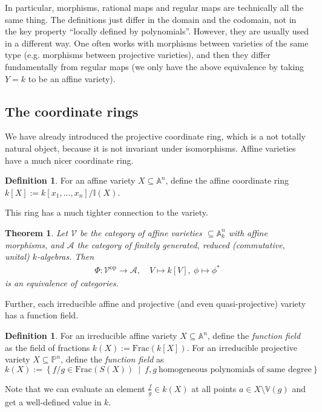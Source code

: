 \documentclass{scrartcl}
\newcommand{\I}{\mathbb{I}}
\newcommand{\V}{\mathbb{V}}
\newtheorem{theorem}[prop]{Theorem}
\theoremstyle{definition}
\newtheorem{definition}[prop]{Definition}
\begin{document}
In particular, morphisms, rational maps and regular maps are technically all the same thing.
The definitions just differ in the domain and the codomain, not in the key property ``locally defined by polynomials''.
However, they are usually used in a different way.
One often works with morphisms between varieties of the same type (e.g. morphisms between projective varieties), and then they differ fundamentally from regular maps (we only have the above equivalence by taking $Y = k$ to be an affine variety).

\subsection{The coordinate rings}
We have already introduced the projective coordinate ring, which is a not totally natural object, because it is not invariant under isomorphisms.
Affine varieties have a much nicer coordinate ring.
\begin{definition}
    For an affine variety $X \subseteq \mathbb{A}^n$, define the affine coordinate ring $k[X] := k[x_1, ..., x_n] / \I(X)$.
\end{definition}
This ring has a much tighter connection to the variety.
\begin{theorem}
    \label{prop:equivalence_of_categories}
    Let $\mathcal{V}$ be the category of affine varieties $\subseteq \mathbb{A}_k^n$ with affine morphisms, and $\mathcal{A}$ the category of finitely generated, reduced (commutative, unital) $k$-algebras.
    Then
    \begin{align*}
        \Phi: \mathcal{V}^{\mathrm{op}} \to \mathcal{A}, \quad V \mapsto k[V], \ \phi \mapsto \phi^*
    \end{align*}
    is an equivalence of categories.
\end{theorem}
Further, each irreducible affine and projective (and even quasi-projective) variety has a function field.
\begin{definition}
    For an irreducible affine variety $X \subseteq \mathbb{A}^n$, define the \emph{function field} as the field of fractions $k(X) := \mathrm{Frac}(k[X])$.
    For an irreducible projective variety $X \subseteq \mathbb{P}^n$, define the \emph{function field} as
    \begin{equation*}
        k(X) := \left\{ f/g \in \mathrm{Frac}(S(X)) \ \middle| \ f, g \ \text{homogeneous polynomials of same degree} \right\}
    \end{equation*}
\end{definition}
Note that we can evaluate an element $\frac f g \in k(X)$ at all points $a \in X \setminus \V(g)$ and get a well-defined value in $k$.
\end{document}
